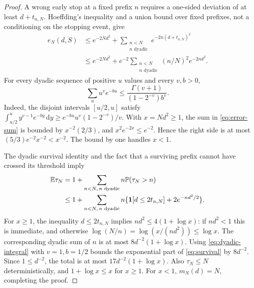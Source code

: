 \begin{proof}
A wrong early stop at a fixed prefix $n$ requires a one-sided deviation
of at least $d+t_{n,N}$. Hoeffding's inequality and a union bound over
fixed prefixes, not a conditioning on the stopping event, give
\begin{align}
 e_N(d,S)
 &\le e^{-2Nd^2}+
       \sum_{\substack{n<N\\n\text{ dyadic}}}e^{-2n(d+t_{n,N})^2}
       \nonumber\\
 &\le e^{-2Nd^2}+e^{-2}
       \sum_{\substack{n<N\\n\text{ dyadic}}}(n/N)^2e^{-2nd^2}.
       \label{eq:error-sum}
\end{align}
For every dyadic sequence of positive $u$ values and every $v,b>0$,
\begin{equation}\label{eq:dyadic-integral}
 \sum_u u^v e^{-bu}
 \le \frac{\Gamma(v+1)}{(1-2^{-v})b^v}.
\end{equation}
Indeed, the disjoint intervals $[u/2,u]$ satisfy
$\int_{u/2}^u y^{v-1}e^{-by}\,\mathrm dy
\ge e^{-bu}u^v(1-2^{-v})/v$.
With $x=Nd^2\ge1$, the sum in \eqref{eq:error-sum} is bounded by
$x^{-2}(2/3)$, and $x^2e^{-2x}\le e^{-2}$. Hence the right side is at most
$(5/3)e^{-2}x^{-2}<x^{-2}$. The bound by one handles $x<1$.

The dyadic survival identity and the fact that a surviving prefix cannot
have crossed its threshold imply
\begin{align}
 \mathbb E\tau_N
 &=1+\sum_{n<N,\,n\text{ dyadic}}n\mathbb P(\tau_N>n)\nonumber\\
 &\le1+\sum_{n<N,\,n\text{ dyadic}}n
       \{\mathbf 1[d\le2t_{n,N}]+2e^{-nd^2/2}\}.\label{eq:survival}
\end{align}
For $x\ge1$, the inequality $d\le2t_{n,N}$ implies
$nd^2\le4(1+\log x)$: if $nd^2<1$ this is immediate, and otherwise
$\log(N/n)=\log(x/(nd^2))\le\log x$.
The corresponding dyadic sum of $n$ is at most
$8d^{-2}(1+\log x)$. Using \eqref{eq:dyadic-integral} with $v=1,b=1/2$
bounds the exponential part of \eqref{eq:survival} by $8d^{-2}$.
Since $1\le d^{-2}$, the total is at most
$17d^{-2}(1+\log x)$. Also $\tau_N\le N$ deterministically, and
$1+\log x\le x$ for $x\ge1$. For $x<1$, $m_N(d)=N$, completing the proof.
\end{proof}

